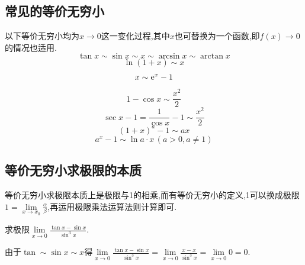 \warn[
{\large \bf 0与``0"的区别}\vspace*{0.5em}\\
\hspace*{1em}(1)\quad ``0"指的是无穷小,设$\alpha$是某一变化过程中的无穷小,也就是说$x$趋于某一值时,极限为0.\vspace*{0.5em}\\
\hspace*{1em}(2)\quad 当0指的是实数0时,$\lim 0 \cdot f(x)=0$,这与$f(x)$无关,即使$\lim f(x)=\infty$,其结果仍然是0,因为0在这里是实数,而不是无穷小.
]


\subsection{常见的等价无穷小}
\ttheorem[常见的等价无穷小]
以下等价无穷小均为$x \to 0$这一变化过程,其中$x$也可替换为一个函数,即$f(x) \to 0$的情况也适用.
\begin{equation}
	\tan x \sim \sin x \sim x \sim \arcsin x \sim \arctan x
\end{equation}
\begin{equation}
	\ln (1+x) \sim x
\end{equation}
\begin{equation}
	x \sim {\rm{e}}^x -1
\end{equation}
\begin{equation}
	1-\cos x \sim \frac{x^2}{2}
\end{equation}
\begin{equation}
	\sec x -1 =\frac{1}{\cos x}-1 \sim \frac{x^2}{2}
\end{equation}
\begin{equation}
	(1+x)^a-1 \sim ax
\end{equation}
\begin{equation}
	a^x-1 \sim \ln a \cdot x \,(a>0,a \ne 1)
\end{equation}
\subsection{等价无穷小求极限的本质}
等价无穷小求极限本质上是极限与1的相乘,而有等价无穷小的定义,1可以换成极限$\displaystyle 1=\lim\limits_{x \to x_0}\frac{\alpha }{\beta}$,再运用极限乘法运算法则计算即可.

\example[等价无穷小的误用]\sj
\examples \label{例 1.8}求极限$\displaystyle \lim\limits_{x \to 0}\frac{\tan x -\sin x}{\sin^3 x}$.

\errsolve  由于$\tan \sim \sin x \sim x$得$\displaystyle \lim\limits_{x \to 0}\frac{\tan x -\sin x}{\sin^3 x}=\lim\limits_{x \to 0}\frac{x-x}{\sin^3 x}=\lim\limits_{x \to 0}0=0.$

